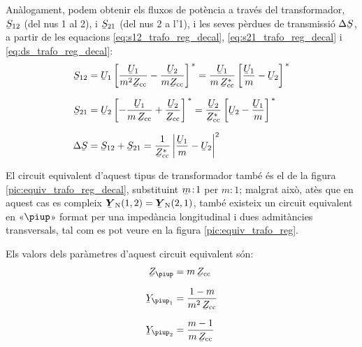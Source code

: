 Anàlogament, podem obtenir els fluxos de potència a través del
transformador, $\cmplx{S}_{12}$ (del nus 1 al 2), i $\cmplx{S}_{21}$
(del nus 2 a l'1), i les seves pèrdues de transmissió
$\Delta\cmplx{S}$, a partir de les equacions
\eqref{eq:s12_trafo_reg_decal},  \eqref{eq:s21_trafo_reg_decal} i
\eqref{eq:ds_trafo_reg_decal}:  
\begin{align}
   \cmplx{S}_{12} &= \cmplx{U}_1 \left[ \frac{\cmplx{U}_1}{m^2 \cmplx{Z}\ped{cc}} - \frac{\cmplx{U}_2}{m \cmplx{Z}\ped{cc}} \right]^{\,*} = \frac{\cmplx{U}_1}{m \,\cmplx{Z}\ped{cc}^*} \left[ \frac{\cmplx{U}_1}{m} - \cmplx{U}_2 \right]^{\,*}  \\[1.5ex]
   \cmplx{S}_{21} &= \cmplx{U}_2 \left[ - \frac{\cmplx{U}_1}{m \,\cmplx{Z}\ped{cc}} + \frac{\cmplx{U}_2} {\cmplx{Z}\ped{cc}} \right]^{\,*} = \frac{\cmplx{U}_2}{\cmplx{Z}\ped{cc}^*} \left[  \cmplx{U}_2 - \frac{\cmplx{U}_1}{m}  \right]^{\,*} \\[1.5ex]
 \Delta\cmplx{S} &= \cmplx{S}_{12} + \cmplx{S}_{21} = \frac{1}{\cmplx{Z}\ped{cc}^*}  \left|
    \frac{\cmplx{U}_1}{m} - \cmplx{U}_2 \right|^2
\end{align}


El circuit equivalent d'aquest tipus de transformador també és el de la
 figura \vref{pic:equiv_trafo_reg_decal}, substituint $\cmplx{m}\!:\!1$ per $m\!:\!1$; malgrat això, atès que en aquest cas es compleix $\mcmplx{Y}\ped{N}(1,2) = \mcmplx{Y}\ped{N}(2,1)$, també
 existeix un circuit equivalent en «$\piup$» format per una impedància longitudinal i dues admitàncies transversals, tal com es pot veure en la figura  \vref{pic:equiv_trafo_reg}.

\begin{center}
    
    \label{pic:equiv_trafo_reg}
\end{center}

Els valors dels paràmetres d'aquest circuit equivalent són:
\begin{align}
   \cmplx{Z}_\piup &= m \, \cmplx{Z}\ped{cc} \\[1.5ex]
   \cmplx{Y}_{\piup_1} &= \frac{1-m}{m^2 \,\cmplx{Z}\ped{cc}} \\[1.5ex]
   \cmplx{Y}_{\piup_2} &= \frac{m-1}{m\, \cmplx{Z}\ped{cc}}
\end{align}

